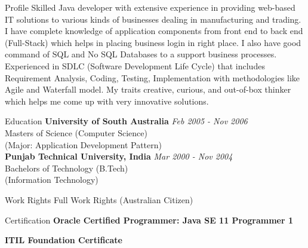 \documentclass{resume}
\begin{document}
\begin{rSection}{Profile}
Skilled Java developer with extensive experience in providing web-based IT solutions to various kinds of businesses dealing in manufacturing and trading. I have complete knowledge of application components from front end to back end (Full-Stack) which helps in placing business login in right place. I also have good command of SQL and No SQL Databases to a support business processes. Experienced in SDLC (Software Development Life Cycle) that includes Requirement Analysis, Coding, Testing, Implementation with methodologies like Agile and Waterfall model. My traits creative, curious, and out-of-box thinker which helps me come up with very innovative solutions. 
\end{rSection}

\begin{rSection}{Education}
{\bf University of South Australia} \hfill {\em  Feb 2005 - Nov 2006} 
\\ Masters of Science (Computer Science)
\\(Major: Application Development Pattern)\\

{\bf Punjab Technical University, India} \hfill {\em  Mar 2000 - Nov 2004} 
\\ Bachelors of Technology (B.Tech)
\\ (Information Technology)

\end{rSection}

\begin{rSection}{Work Rights}
Full Work Rights (Australian Citizen)

\end{rSection}

\begin{rSection}{Certification}
{\bf Oracle Certified Programmer: Java SE 11 Programmer 1} 

{\bf ITIL Foundation Certificate} 

\end{rSection}
\end{document}
